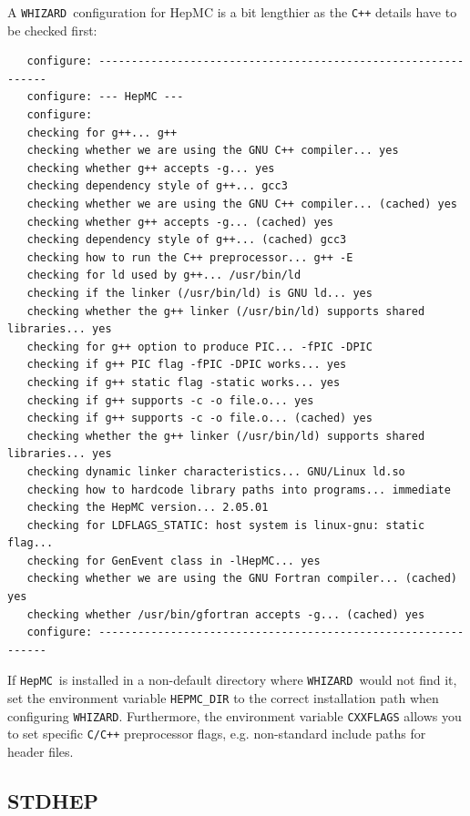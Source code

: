 \documentclass[12pt]{book}
\newcommand{\ttt}[1]{\texttt{#1}}
\newcommand{\whizard}{\texttt{WHIZARD}}
\newcommand{\hepmc}{\texttt{HepMC}}
\begin{document}
A \whizard\ configuration for HepMC is a bit lengthier as the
\ttt{C++} details have to be checked first:
\begin{footnotesize}
  \begin{verbatim}
   configure: --------------------------------------------------------------
   configure: --- HepMC ---
   configure:
   checking for g++... g++
   checking whether we are using the GNU C++ compiler... yes
   checking whether g++ accepts -g... yes
   checking dependency style of g++... gcc3
   checking whether we are using the GNU C++ compiler... (cached) yes
   checking whether g++ accepts -g... (cached) yes
   checking dependency style of g++... (cached) gcc3
   checking how to run the C++ preprocessor... g++ -E
   checking for ld used by g++... /usr/bin/ld
   checking if the linker (/usr/bin/ld) is GNU ld... yes
   checking whether the g++ linker (/usr/bin/ld) supports shared libraries... yes
   checking for g++ option to produce PIC... -fPIC -DPIC
   checking if g++ PIC flag -fPIC -DPIC works... yes
   checking if g++ static flag -static works... yes
   checking if g++ supports -c -o file.o... yes
   checking if g++ supports -c -o file.o... (cached) yes
   checking whether the g++ linker (/usr/bin/ld) supports shared libraries... yes
   checking dynamic linker characteristics... GNU/Linux ld.so
   checking how to hardcode library paths into programs... immediate
   checking the HepMC version... 2.05.01
   checking for LDFLAGS_STATIC: host system is linux-gnu: static flag...
   checking for GenEvent class in -lHepMC... yes
   checking whether we are using the GNU Fortran compiler... (cached) yes
   checking whether /usr/bin/gfortran accepts -g... (cached) yes
   configure: --------------------------------------------------------------    
  \end{verbatim}
\end{footnotesize}

If \hepmc\ is installed in a non-default directory where \whizard\
would not find it, set the environment variable \ttt{HEPMC\_DIR} to
the correct installation path when configuring \whizard.  Furthermore,
the environment variable \ttt{CXXFLAGS} allows you to set specific
\ttt{C/C++} preprocessor flags, e.g. non-standard include paths for
header files.



\subsection{STDHEP}
\label{sec:stdhep}
\end{document}

